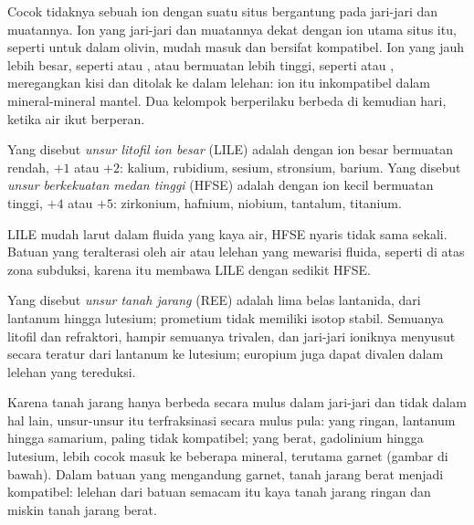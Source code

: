 Cocok tidaknya sebuah ion dengan suatu situs bergantung pada jari-jari dan muatannya. Ion yang
jari-jari dan muatannya dekat dengan ion utama situs itu, seperti  untuk  dalam
olivin, mudah masuk dan bersifat kompatibel. Ion yang jauh lebih besar, seperti
 atau , atau bermuatan lebih tinggi, seperti  atau
, meregangkan kisi dan ditolak ke dalam lelehan: ion itu
inkompatibel dalam mineral-mineral mantel. Dua kelompok 
berperilaku berbeda di kemudian hari, ketika air ikut berperan.

\begin{definition}
\label{def:b2:elements-in-the-earth:lile-hfse}
Yang disebut \emph{unsur litofil ion besar}
(LILE) adalah  dengan ion besar bermuatan rendah, $+1$ atau $+2$:
kalium, rubidium, sesium, stronsium, barium. Yang disebut
\emph{unsur berkekuatan medan tinggi} (HFSE)
adalah  dengan ion kecil bermuatan tinggi, $+4$ atau $+5$:
zirkonium, hafnium, niobium, tantalum, titanium.
\end{definition}

LILE mudah larut dalam fluida yang kaya air, HFSE nyaris tidak sama sekali. Batuan yang
teralterasi oleh air atau lelehan yang mewarisi fluida, seperti di atas zona subduksi,
karena itu membawa LILE dengan sedikit HFSE.

\begin{definition}\label{def:b2:elements-in-the-earth:ree}
Yang disebut \emph{unsur tanah jarang} (REE) adalah lima belas
lantanida, dari lantanum hingga lutesium; prometium tidak memiliki isotop stabil. Semuanya
litofil dan refraktori, hampir semuanya trivalen, dan jari-jari ioniknya
menyusut secara teratur dari lantanum ke lutesium; europium juga dapat divalen dalam
lelehan yang tereduksi.
\end{definition}

Karena tanah jarang hanya berbeda secara mulus dalam jari-jari dan tidak dalam hal lain,
unsur-unsur itu terfraksinasi secara mulus pula: yang ringan, lantanum hingga samarium, paling tidak
kompatibel; yang berat, gadolinium hingga lutesium, lebih cocok masuk ke beberapa
mineral, terutama garnet (gambar di bawah). Dalam batuan yang mengandung garnet, tanah jarang berat
menjadi kompatibel: lelehan dari batuan semacam itu kaya tanah jarang ringan dan
miskin tanah jarang berat.

